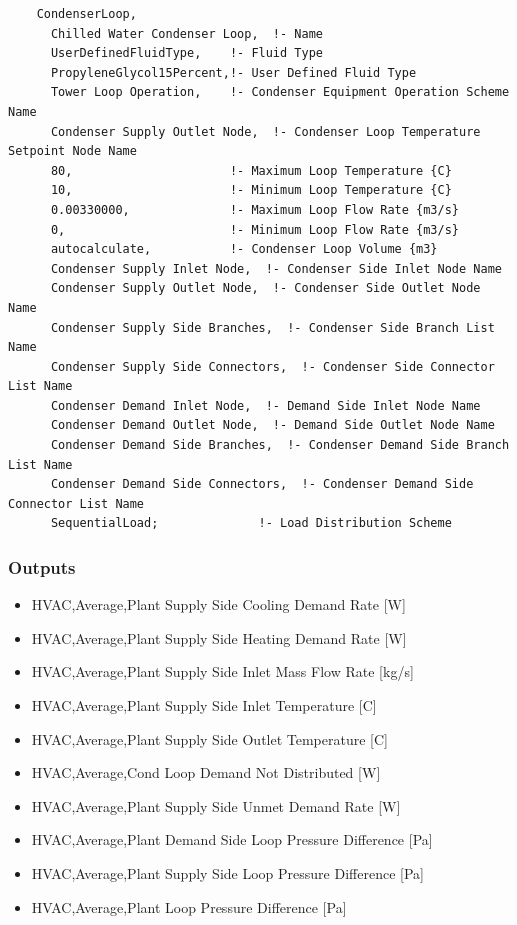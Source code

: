 \begin{lstlisting}
    CondenserLoop,
      Chilled Water Condenser Loop,  !- Name
      UserDefinedFluidType,    !- Fluid Type
      PropyleneGlycol15Percent,!- User Defined Fluid Type
      Tower Loop Operation,    !- Condenser Equipment Operation Scheme Name
      Condenser Supply Outlet Node,  !- Condenser Loop Temperature Setpoint Node Name
      80,                      !- Maximum Loop Temperature {C}
      10,                      !- Minimum Loop Temperature {C}
      0.00330000,              !- Maximum Loop Flow Rate {m3/s}
      0,                       !- Minimum Loop Flow Rate {m3/s}
      autocalculate,           !- Condenser Loop Volume {m3}
      Condenser Supply Inlet Node,  !- Condenser Side Inlet Node Name
      Condenser Supply Outlet Node,  !- Condenser Side Outlet Node Name
      Condenser Supply Side Branches,  !- Condenser Side Branch List Name
      Condenser Supply Side Connectors,  !- Condenser Side Connector List Name
      Condenser Demand Inlet Node,  !- Demand Side Inlet Node Name
      Condenser Demand Outlet Node,  !- Demand Side Outlet Node Name
      Condenser Demand Side Branches,  !- Condenser Demand Side Branch List Name
      Condenser Demand Side Connectors,  !- Condenser Demand Side Connector List Name
      SequentialLoad;              !- Load Distribution Scheme
\end{lstlisting}

\subsubsection{Outputs}\label{outputs-1-018}

\begin{itemize}
\item
  HVAC,Average,Plant Supply Side Cooling Demand Rate {[}W{]}
\item
  HVAC,Average,Plant Supply Side Heating Demand Rate {[}W{]}
\item
  HVAC,Average,Plant Supply Side Inlet Mass Flow Rate {[}kg/s{]}
\item
  HVAC,Average,Plant Supply Side Inlet Temperature {[}C{]}
\item
  HVAC,Average,Plant Supply Side Outlet Temperature {[}C{]}
\item
  HVAC,Average,Cond Loop Demand Not Distributed {[}W{]}
\item
  HVAC,Average,Plant Supply Side Unmet Demand Rate {[}W{]}
\item
  HVAC,Average,Plant Demand Side Loop Pressure Difference {[}Pa{]}
\item
  HVAC,Average,Plant Supply Side Loop Pressure Difference {[}Pa{]}
\item
  HVAC,Average,Plant Loop Pressure Difference {[}Pa{]}
\end{itemize}

